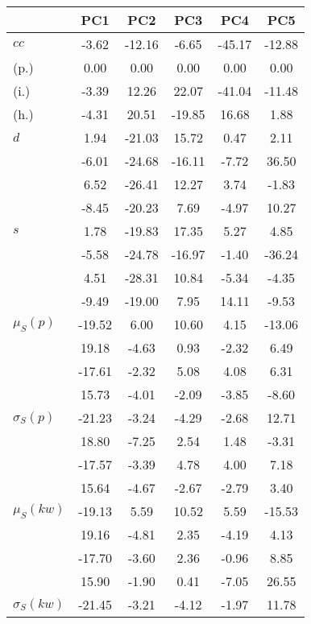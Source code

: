 \begin{table}[h!]
\begin{center}
\begin{tabular}{| l | c | c | c | c | c |}\hline
 & PC1 & PC2 & PC3 & PC4 & PC5 \\\hline
$cc$ & -3.62  & -12.16  & -6.65  & -45.17  & -12.88 \\\hline
(p.) & 0.00  & 0.00  & 0.00  & 0.00  & 0.00 \\\hline
(i.) & -3.39  & 12.26  & 22.07  & -41.04  & -11.48 \\\hline
(h.) & -4.31  & 20.51  & -19.85  & 16.68  & 1.88 \\\hline
$d$ & 1.94  & -21.03  & 15.72  & 0.47  & 2.11 \\\hline
 & -6.01  & -24.68  & -16.11  & -7.72  & 36.50 \\\hline
 & 6.52  & -26.41  & 12.27  & 3.74  & -1.83 \\\hline
 & -8.45  & -20.23  & 7.69  & -4.97  & 10.27 \\\hline
$s$ & 1.78  & -19.83  & 17.35  & 5.27  & 4.85 \\\hline
 & -5.58  & -24.78  & -16.97  & -1.40  & -36.24 \\\hline
 & 4.51  & -28.31  & 10.84  & -5.34  & -4.35 \\\hline
 & -9.49  & -19.00  & 7.95  & 14.11  & -9.53 \\\hline
$\mu_S(p)$ & -19.52  & 6.00  & 10.60  & 4.15  & -13.06 \\\hline
 & 19.18  & -4.63  & 0.93  & -2.32  & 6.49 \\\hline
 & -17.61  & -2.32  & 5.08  & 4.08  & 6.31 \\\hline
 & 15.73  & -4.01  & -2.09  & -3.85  & -8.60 \\\hline
$\sigma_S(p)$ & -21.23  & -3.24  & -4.29  & -2.68  & 12.71 \\\hline
 & 18.80  & -7.25  & 2.54  & 1.48  & -3.31 \\\hline
 & -17.57  & -3.39  & 4.78  & 4.00  & 7.18 \\\hline
 & 15.64  & -4.67  & -2.67  & -2.79  & 3.40 \\\hline
$\mu_S(kw)$ & -19.13  & 5.59  & 10.52  & 5.59  & -15.53 \\\hline
 & 19.16  & -4.81  & 2.35  & -4.19  & 4.13 \\\hline
 & -17.70  & -3.60  & 2.36  & -0.96  & 8.85 \\\hline
 & 15.90  & -1.90  & 0.41  & -7.05  & 26.55 \\\hline
$\sigma_S(kw)$ & -21.45  & -3.21  & -4.12  & -1.97  & 11.78 \\\hline

\end{tabular}
\end{center}
\end{table}

